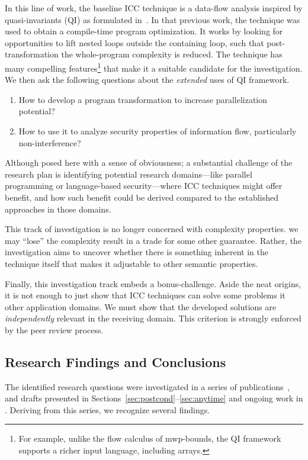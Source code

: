 In this line of work, the baseline ICC technique is a data-flow analysis inspired by quasi-invariants (QI) as formulated in~\textcite{moyen20172}.
In that previous work, the technique was used to obtain a compile-time program optimization.
It works by looking for opportunities to lift nested loops outside the containing loop, such that post-transformation the whole-program complexity is reduced.
The technique has many compelling features\footnote{For example, unlike the flow calculus of mwp-bounds, the QI framework supports a richer input language, including arrays.} that make it a suitable candidate for the investigation.
We then ask the following questions about the \emph{extended} uses of QI framework.
\begin{enumerate}
\item How to develop a program transformation to increase parallelization potential?
\item How to use it to analyze security properties of information flow, particularly non-interference?
\end{enumerate}
Although posed here with a sense of obviousness;
a substantial challenge of the research plan is {identifying} potential research domains---like parallel programming or language-based security---where ICC techniques might offer benefit, and how such benefit could be derived compared to the established approaches in those domains.

This track of investigation is no longer concerned with complexity properties.
\Ie we may \enquote{lose} the complexity result in a trade for some other guarantee.
Rather, the investigation aims to uncover whether there is something inherent in the {technique} itself that makes it adjustable to other semantic properties.

Finally, this investigation track embeds a bonus-challenge.
Aside the neat origins, it is not enough to just show that ICC techniques can solve some problems it other application domains.
We must show that the developed solutions are \emph{independently} relevant in the receiving domain.
This criterion is strongly enforced by the peer review process.

\subsection{Research Findings and Conclusions}

The identified research questions were investigated in a series of publications~\cite{aubert20222,aubert20232,aubert2023b}, and drafts presented in Sections~\ref{sec:postcond}--\ref{sec:anytime} and ongoing work in \cite{aubert20231}.
Deriving from this series, we recognize several findings.

